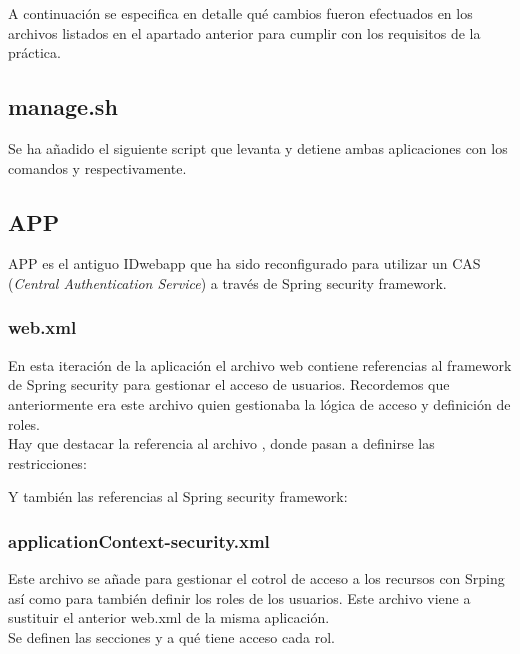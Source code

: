 \documentclass[10pt,a4paper]{article}
\begin{document}
A continuación se especifica en detalle qué cambios fueron efectuados en los archivos listados en el apartado anterior para cumplir con los requisitos de la práctica.

\subsection*{manage.sh}
Se ha añadido el siguiente script que levanta y detiene ambas aplicaciones con los comandos  y  respectivamente.



\subsection*{APP}
APP es el antiguo IDwebapp que ha sido reconfigurado para utilizar un CAS (\textit{Central Authentication Service}) a través de Spring security framework.

\subsubsection*{web.xml}
En esta iteración de la aplicación el archivo web contiene referencias al framework de Spring security para gestionar el acceso de usuarios. Recordemos que anteriormente era este archivo quien gestionaba la lógica de acceso y definición de roles.\\
Hay que destacar la referencia al archivo , donde pasan a definirse las restricciones:


Y también las referencias al Spring security framework:


\subsubsection*{applicationContext-security.xml}
Este archivo se añade para gestionar el cotrol de acceso a los recursos con Srping así como para también definir los roles de los usuarios. Este archivo viene a sustituir el anterior web.xml de la misma aplicación.\\

Se definen las secciones y a qué tiene acceso cada rol.

\vspace{.3cm}
\end{document}
